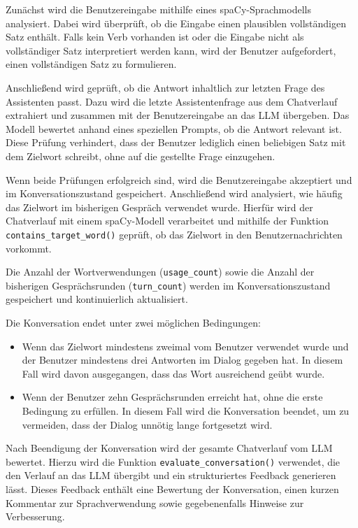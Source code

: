 Zunächst wird die Benutzereingabe mithilfe eines spaCy-Sprachmodells analysiert. 
Dabei wird überprüft, ob die Eingabe einen plausiblen vollständigen Satz enthält. 
Falls kein Verb vorhanden ist oder die Eingabe nicht als vollständiger Satz interpretiert werden kann, wird der Benutzer aufgefordert, einen vollständigen Satz zu formulieren.

Anschließend wird geprüft, ob die Antwort inhaltlich zur letzten Frage des Assistenten passt. 
Dazu wird die letzte Assistentenfrage aus dem Chatverlauf extrahiert und zusammen mit der Benutzereingabe an das LLM übergeben. 
Das Modell bewertet anhand eines speziellen Prompts, ob die Antwort relevant ist. 
Diese Prüfung verhindert, dass der Benutzer lediglich einen beliebigen Satz mit dem Zielwort schreibt, ohne auf die gestellte Frage einzugehen.

Wenn beide Prüfungen erfolgreich sind, wird die Benutzereingabe akzeptiert und im Konversationszustand gespeichert. 
Anschließend wird analysiert, wie häufig das Zielwort im bisherigen Gespräch verwendet wurde. 
Hierfür wird der Chatverlauf mit einem spaCy-Modell verarbeitet und mithilfe der Funktion \texttt{contains\_target\_word()} geprüft, ob das Zielwort in den Benutzernachrichten vorkommt.

Die Anzahl der Wortverwendungen (\texttt{usage\_count}) sowie die Anzahl der bisherigen Gesprächsrunden (\texttt{turn\_count}) werden im Konversationszustand gespeichert und kontinuierlich aktualisiert.

Die Konversation endet unter zwei möglichen Bedingungen:
\begin{itemize}
    \item Wenn das Zielwort mindestens zweimal vom Benutzer verwendet wurde und der Benutzer mindestens drei Antworten im Dialog gegeben hat. 
    In diesem Fall wird davon ausgegangen, dass das Wort ausreichend geübt wurde.
    \item Wenn der Benutzer zehn Gesprächsrunden erreicht hat, ohne die erste Bedingung zu erfüllen. 
    In diesem Fall wird die Konversation beendet, um zu vermeiden, dass der Dialog unnötig lange fortgesetzt wird.
\end{itemize}

Nach Beendigung der Konversation wird der gesamte Chatverlauf vom LLM bewertet. 
Hierzu wird die Funktion \texttt{evaluate\_conversation()} verwendet, die den Verlauf an das LLM übergibt und ein strukturiertes Feedback generieren lässt. 
Dieses Feedback enthält eine Bewertung der Konversation, einen kurzen Kommentar zur Sprachverwendung sowie gegebenenfalls Hinweise zur Verbesserung.


